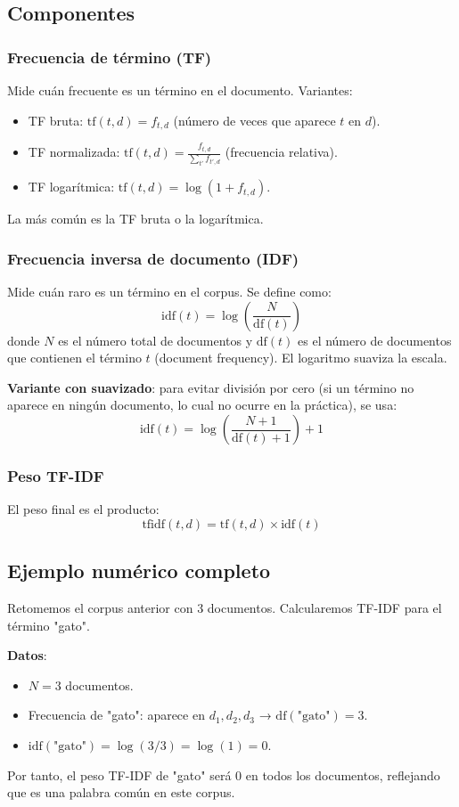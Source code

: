 \documentclass[12pt,a4paper,openany,oneside]{book}
\begin{document}
\subsection{Componentes}
\subsubsection{Frecuencia de término (TF)}
Mide cuán frecuente es un término en el documento. Variantes:
\begin{itemize}
    \item TF bruta: \( \text{tf}(t,d) = f_{t,d} \) (número de veces que aparece \(t\) en \(d\)).
    \item TF normalizada: \( \text{tf}(t,d) = \frac{f_{t,d}}{\sum_{t'} f_{t',d}} \) (frecuencia relativa).
    \item TF logarítmica: \( \text{tf}(t,d) = \log(1 + f_{t,d}) \).
\end{itemize}
La más común es la TF bruta o la logarítmica.

\subsubsection{Frecuencia inversa de documento (IDF)}
Mide cuán raro es un término en el corpus. Se define como:
\[
\text{idf}(t) = \log\left( \frac{N}{\text{df}(t)} \right)
\]
donde \(N\) es el número total de documentos y \(\text{df}(t)\) es el número de documentos que contienen el término \(t\) (document frequency). El logaritmo suaviza la escala.

\textbf{Variante con suavizado}: para evitar división por cero (si un término no aparece en ningún documento, lo cual no ocurre en la práctica), se usa:
\[
\text{idf}(t) = \log\left( \frac{N + 1}{\text{df}(t) + 1} \right) + 1
\]

\subsubsection{Peso TF-IDF}
El peso final es el producto:
\[
\text{tfidf}(t,d) = \text{tf}(t,d) \times \text{idf}(t)
\]

\subsection{Ejemplo numérico completo}
Retomemos el corpus anterior con 3 documentos. Calcularemos TF-IDF para el término "gato".

\textbf{Datos}:
\begin{itemize}
    \item \(N = 3\) documentos.
    \item Frecuencia de "gato": aparece en \(d_1, d_2, d_3\) → \(\text{df}(\text{"gato"}) = 3\).
    \item \(\text{idf}(\text{"gato"}) = \log(3/3) = \log(1) = 0\).
\end{itemize}
Por tanto, el peso TF-IDF de "gato" será 0 en todos los documentos, reflejando que es una palabra común en este corpus.
\end{document}
